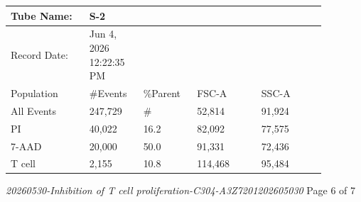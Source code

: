 \documentclass[UTF8,10pt,a4paper,fontset=fandol]{ctexart}
\newcommand{\fieldvalue}[1]{#1}
\begin{document}
\vspace{0.3cm}

\begin{center}
\small
\begin{tabular}{|p{0.22\linewidth}|p{0.15\linewidth}|p{0.15\linewidth}|p{0.18\linewidth}|p{0.18\linewidth}|}
\hline
Tube Name: &
\fieldvalue{S-2} &
\multicolumn{3}{l|}{}\\
\hline
Record Date: &
\fieldvalue{Jun 4, 2026 12:22:35 PM} &
\multicolumn{3}{l|}{}\\
\hline
Population & \#Events & \%Parent & FSC-A & SSC-A\\
\hline
All Events &
\fieldvalue{247,729} &
\fieldvalue{\#} &
\fieldvalue{52,814} &
\fieldvalue{91,924}\\
\hline
PI &
\fieldvalue{40,022} &
\fieldvalue{16.2} &
\fieldvalue{82,092} &
\fieldvalue{77,575}\\
\hline
7-AAD &
\fieldvalue{20,000} &
\fieldvalue{50.0} &
\fieldvalue{91,331} &
\fieldvalue{72,436}\\
\hline
T cell &
\fieldvalue{2,155} &
\fieldvalue{10.8} &
\fieldvalue{114,468} &
\fieldvalue{95,484}\\
\hline
\end{tabular}
\end{center}

\vfill

\noindent
\textit{20260530-Inhibition of T cell proliferation-C304-A3Z7201202605030}
\hfill Page 6 of 7
\end{document}
